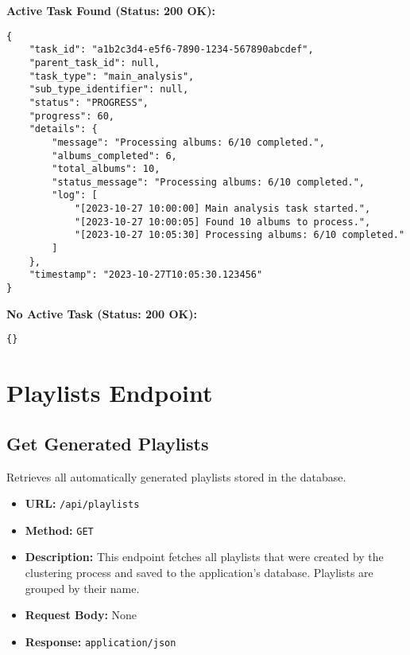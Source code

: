\documentclass{article}
\begin{document}
\textbf{Active Task Found (Status: 200 OK):}
\lstset{language=json, caption=Example Response: Get Active Tasks (Active Task Found)}
\begin{lstlisting}
{
    "task_id": "a1b2c3d4-e5f6-7890-1234-567890abcdef",
    "parent_task_id": null,
    "task_type": "main_analysis",
    "sub_type_identifier": null,
    "status": "PROGRESS",
    "progress": 60,
    "details": {
        "message": "Processing albums: 6/10 completed.",
        "albums_completed": 6,
        "total_albums": 10,
        "status_message": "Processing albums: 6/10 completed.",
        "log": [
            "[2023-10-27 10:00:00] Main analysis task started.",
            "[2023-10-27 10:00:05] Found 10 albums to process.",
            "[2023-10-27 10:05:30] Processing albums: 6/10 completed."
        ]
    },
    "timestamp": "2023-10-27T10:05:30.123456"
}
\end{lstlisting}

\textbf{No Active Task (Status: 200 OK):}
\lstset{language=json, caption=Example Response: Get Active Tasks (No Active Task)}
\begin{lstlisting}
{}
\end{lstlisting}

\section{Playlists Endpoint}

\subsection{Get Generated Playlists}
Retrieves all automatically generated playlists stored in the database.
\begin{itemize}[noitemsep]
    \item \textbf{URL:} \verb|/api/playlists|
    \item \textbf{Method:} \texttt{GET}
    \item \textbf{Description:} This endpoint fetches all playlists that were created by the clustering process and saved to the application's database. Playlists are grouped by their name.
    \item \textbf{Request Body:} None
    \item \textbf{Response:} \texttt{application/json}
\end{itemize}
\end{document}
